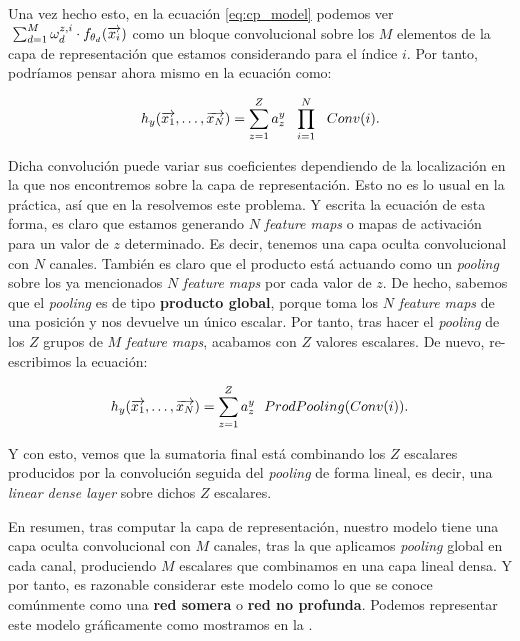 Una vez hecho esto, en la ecuación \eqref{eq:cp_model} podemos ver $\; \sum_{d = 1}^{M} \omega^{z, i}_d \cdot f_{\theta_{d}}(\overrightarrow{x_i})$ como un bloque convolucional sobre los $M$ elementos de la capa de representación que estamos considerando para el índice $i$. Por tanto, podríamos pensar ahora mismo en la ecuación como:

\begin{equation}
	h_y(\overrightarrow{x_1}, \ldots, \overrightarrow{x_N}) =  \sum_{z = 1}^Z a_z^y \ \  \prod_{i = 1}^N \ \  Conv(i).
\end{equation}

Dicha convolución puede variar sus coeficientes dependiendo de la localización en la que nos encontremos sobre la capa de representación. Esto no es lo usual en la práctica, así que en la  resolvemos este problema. Y escrita la ecuación de esta forma, es claro que estamos generando $N$ \textit{feature maps} o mapas de activación para un valor de $z$ determinado. Es decir, tenemos una capa oculta convolucional con $N$ canales. También es claro que el producto está actuando como un \textit{pooling} sobre los ya mencionados $N$ \textit{feature maps} por cada valor de $z$. De hecho, sabemos que el \textit{pooling} es de tipo \textbf{producto global}, porque toma los $N$ \textit{feature maps} de una posición y nos devuelve un único escalar. Por tanto, tras hacer el \textit{pooling} de los $Z$ grupos de $M$ \textit{feature maps}, acabamos con $Z$ valores escalares. De nuevo, re-escribimos la ecuación:

\begin{equation}
	h_y(\overrightarrow{x_1}, \ldots, \overrightarrow{x_N}) =  \sum_{z = 1}^Z a_z^y \ \  ProdPooling( Conv(i) ).
\end{equation}

Y con esto, vemos que la sumatoria final está combinando los $Z$ escalares producidos por la convolución seguida del \textit{pooling} de forma lineal, es decir, una \textit{linear dense layer} sobre dichos $Z$ escalares.

En resumen, tras computar la capa de representación, nuestro modelo tiene una capa oculta convolucional con $M$ canales, tras la que aplicamos \textit{pooling} global en cada canal, produciendo $M$ escalares que combinamos en una capa lineal densa. Y por tanto, es razonable considerar este modelo como lo que se conoce comúnmente como una \textbf{red somera} o \textbf{red no profunda}. Podemos representar este modelo gráficamente como mostramos en la .

